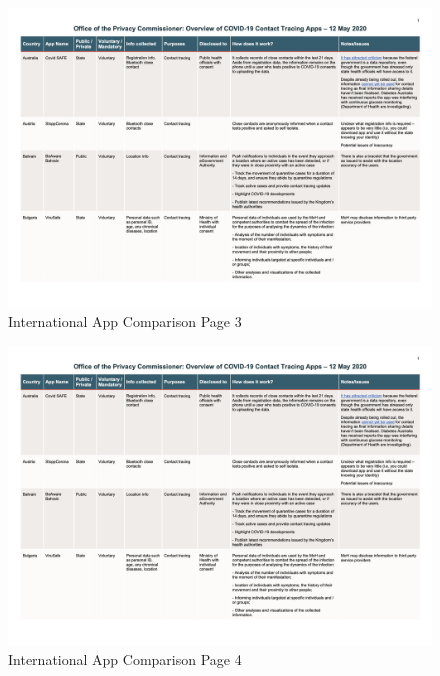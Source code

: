 \documentclass{scrreprt}
\begin{document}
\begin{figure}[H]
	\centering
	\includegraphics[page=3, width=0.9\linewidth]{2020-05-12-OPC-Comparison-of-COVID-19-Apps-colours}
	\caption{International App Comparison Page 3}
	\label{fig:3_2020-05-12-OPC-Comparison-of-COVID-19-Apps-colours}
\end{figure}

\begin{figure}[H]
	\centering
	\includegraphics[page=4, width=0.9\linewidth]{2020-05-12-OPC-Comparison-of-COVID-19-Apps-colours}
	\caption{International App Comparison Page 4}
	\label{fig:4_2020-05-12-OPC-Comparison-of-COVID-19-Apps-colours}
\end{figure}
\end{document}
